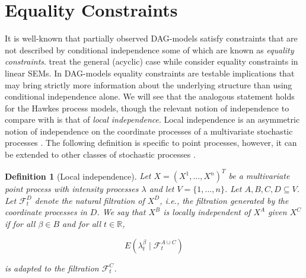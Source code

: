 \documentclass[accepted]{uai2021} %
\newtheorem{defn}[thm]{Definition}
\begin{document}
\begin{comment}
\begin{proof}
	In Equation \ref{eq:covCauFunc}, we note that $\phi_{\beta\alpha}$ only 
	appears in the $\beta$-row of the equations. Every parent of $\beta$ is 
	observed and therefore this row only depends on observed quantities. If 
	there were two solutions to the equations in the $\beta$-row such that 
	$\phi_{\beta\alpha}$ differed between the two solutions, then there would 
	also 
	be two solutions to Equation (\ref{eq:covCauFunc}) which is a contradiction.
\end{proof}

Under the conditions of Proposition \ref{prop:gPaId}, it also follows 
immediately that $\Phi_{\beta\alpha}$ is identified from the observed 
infinitesimal covariance process and $\Lambda_{OO}$ we will use this in Section 
\ref{ssec:eqInfCov} to obtain further constraints.

\end{comment}


\section{Equality Constraints}
\label{sec:eq}

It is well-known that partially observed DAG-models satisfy 
constraints that 
are not described by conditional independence some of which are known as 
\emph{equality constraints}. \cite{richardson2017} treat the general (acyclic) 
case 
while \cite{chen2014, chenNIPS2016} consider equality constraints in linear 
SEMs. In DAG-models equality constraints are testable implications that may 
bring strictly more information about the underlying structure than using 
conditional independence alone. We will see that the analogous statement holds 
for the Hawkes process models, though the relevant notion of independence to 
compare with is 
that of \emph{local independence}. Local independence is an asymmetric notion 
of independence on the coordinate processes of
a multivariate stochastic processes \citep{schweder1970, aalen1987, 
didelez2000, 
didelez2008}. The following definition is specific to point processes, however, 
it can be extended to other classes of stochastic processes 
\citep{aalen1987,didelez2006,mogensenUAI2018,mogensen2018}.

\begin{defn}[Local independence]
	Let $X = (X^1,\ldots,X^n)^T$ be a multivariate point process with intensity 
	processes $\lambda$ and let $V=\{1,\ldots,n\}$. Let $A,B,C,D \subseteq V$. 
	Let $\mathcal{F}_t^D$ denote the natural filtration of $X^D$, i.e., the 
	filtration generated by the coordinate processes in $D$. We say that $X^B$ 
	is \emph{locally independent of $X^A$ given $X^C$} if for all $\beta\in B$ 
	and 
	for all $t\in \mathbb{R}$,
	
	$$
	E(\lambda_t^\beta \mid \mathcal{F}_t^{A\cup C})
	$$
	
	is adapted to the filtration $\mathcal{F}_t^C$.
	\label{def:li}
\end{defn}
\end{document}
